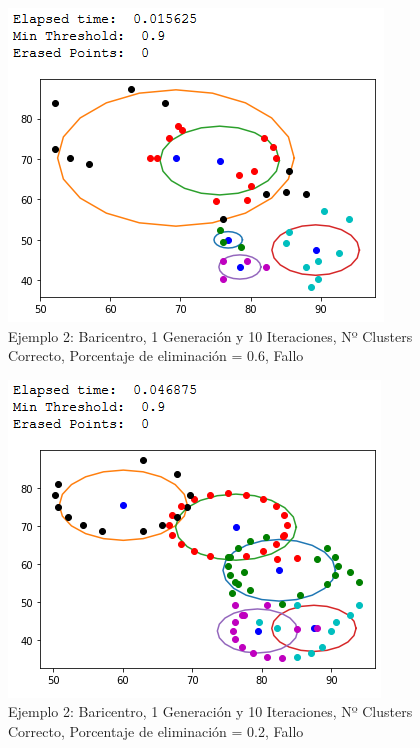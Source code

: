 \documentclass[conference,a4paper]{IEEEtran}
\begin{document}
\begin{figure}[H]
\centering
\includegraphics[scale=0.65]{Experimentacion/Ejemplo2/ej2_b_1_10_me_wrong}
\caption{Ejemplo 2: Baricentro, 1 Generación y 10 Iteraciones,  Nº Clusters Correcto, Porcentaje de eliminación = 0.6, Fallo\\}
\end{figure}

\begin{figure}[H]
\centering
\includegraphics[scale=0.65]{Experimentacion/Ejemplo2/ej2_b_1_10_le_wrong}
\caption{Ejemplo 2: Baricentro, 1 Generación y 10 Iteraciones,  Nº Clusters Correcto, Porcentaje de eliminación = 0.2, Fallo\\}
\end{figure}
\end{document}
